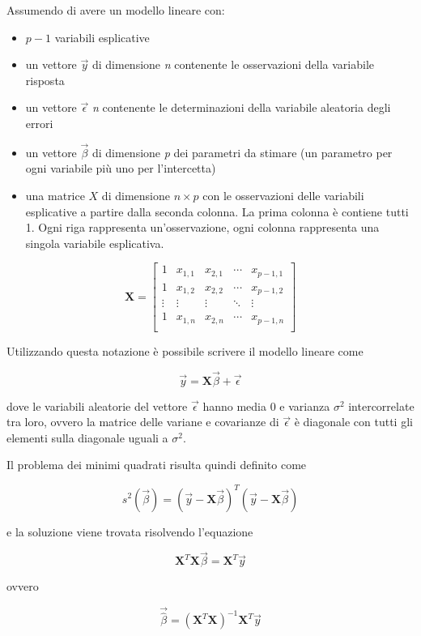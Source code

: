 Assumendo di avere un modello lineare con:
\begin{itemize}
	\item $ p-1$ variabili esplicative
	\item un vettore $ \vec{y} $ di dimensione \textit{n} contenente le osservazioni della variabile risposta
	\item un vettore $ \vec{\epsilon} $ \textit{n} contenente le determinazioni della variabile aleatoria degli errori
	\item un vettore $ \vec{\beta} $ di dimensione \textit{p} dei parametri da stimare (un parametro per ogni variabile più uno per l'intercetta)
	\item una matrice $ X $ di dimensione $ n \times p $ con le osservazioni delle variabili esplicative a partire dalla seconda colonna. La prima colonna è contiene tutti 1. Ogni riga rappresenta un'osservazione, ogni colonna rappresenta una singola variabile esplicativa.
\end{itemize}

$$
\textbf{X} = \begin{bmatrix}
1 & x_{1,1} & x_{2,1} & \cdots & x_{p-1,1} \\
1 & x_{1,2} & x_{2,2} & \cdots & x_{p-1,2} \\
\vdots & \vdots & \vdots & \ddots & \vdots \\
1 & x_{1,n} & x_{2,n} & \cdots & x_{p-1,n} \\
\end{bmatrix}
$$

Utilizzando questa notazione è possibile scrivere il modello lineare come

$$
\vec{y} = \textbf{X}\vec{\beta} + \vec{\epsilon}
$$

dove le variabili aleatorie del vettore $ \vec{\epsilon} $ hanno media 0 e varianza $ \sigma^2 $ intercorrelate tra loro, ovvero la matrice delle variane e covarianze di $ \vec{\epsilon} $ è diagonale con tutti gli elementi sulla diagonale uguali a $ \sigma^2 $.

Il problema dei minimi quadrati risulta quindi definito come

$$
s^2(\vec{\beta}) = (\vec{y} - \textbf{X}\vec{\beta})^T(\vec{y} - \textbf{X}\vec{\beta})
$$

e la soluzione viene trovata risolvendo l'equazione

$$
\textbf{X}^T\textbf{X}\vec{\beta} = \textbf{X}^T\vec{y}
$$

ovvero

$$
\vec{\hat{\beta}} = (\textbf{X}^T\textbf{X})^{-1}\textbf{X}^T\vec{y}
$$

